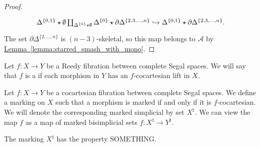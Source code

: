 \documentclass[main.tex]{subfiles}
\begin{document}
\begin{proof}
  \begin{equation*}
    \begin{tikzcd}
      \Delta^{\{0, 1\}} \star \emptyset \coprod_{\Delta^{\{0\}} \star \emptyset} \Delta^{\{0\}} \star \partial \Delta^{\{2, 3, \ldots, n\}} \hookrightarrow \Delta^{\{0, 1\}} \star \partial \Delta^{\{2, 3, \ldots, n\}}.
    \end{tikzcd}
  \end{equation*}
  The set $\partial \Delta^{\{2, \ldots, n\}}$ is $(n-3)$-skeletal, so this map belongs to $\mathcal{A}$ by \hyperref[lemma:starred_smash_with_mono]{Lemma~\ref*{lemma:starred_smash_with_mono}}.
\end{proof}

\begin{definition}
  \label{def:cocartesian_fibration_between_complete_segal_spaces}
  Let $f\colon X \to Y$ be a Reedy fibration between complete Segal spaces. We will say that $f$ is a  if each morphism in $Y$ has an $f$-cocartesian lift in $X$.
\end{definition}

\begin{definition}
  \label{def:cocoartesian_marking_on_complete_segal_spaces}
  Let $f\colon X \to Y$ be a cocartesian fibration between complete Segal spaces. We define a marking on $X$ such that a morphism is marked if and only if it is $f$-cocartesian. We will denote the corresponding marked simplicial by set $X^{\natural}$. We can view the map $f$ as a map of marked bisimplicial sets $f\colon X^{\natural} \to Y^{\sharp}$.
\end{definition}

\begin{lemma}
  The marking $X^{\natural}$ has the property SOMETHING.
\end{lemma}
\end{document}
